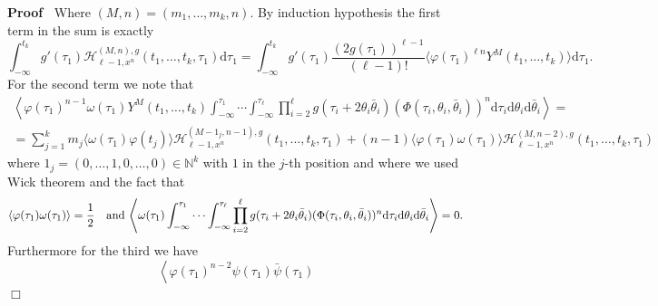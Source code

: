 \documentclass[a4paper,10pt]{article}
\newcommand{\mathd}{\mathrm{d}}
\newenvironment{proof}{\noindent\textbf{Proof\ }}{\hspace*{\fill}$\Box$\medskip}
\begin{document}
\begin{proof}
  Where $(M, n) = (m_1, \ldots, m_k, n)$. By induction hypothesis the first
  term in the sum is exactly
  \[ \int_{- \infty}^{t_k} g' (\tau_1) \mathcal{H}^{(M, n), g}_{\ell - 1, x^n}
     (t_1, \ldots, t_k, \tau_1) \mathd \tau_1 = \int_{- \infty}^{t_k} g'
     (\tau_1) \frac{(2 g (\tau_1))^{\ell - 1}}{(\ell - 1) !} \langle \varphi
     (\tau_1)^{\ell n} Y^M (t_1, \ldots, t_k) \rangle \mathd \tau_1 . \]
  For the second term we note that
  \begin{multline*} \left\langle \varphi (\tau_1)^{n - 1} \omega (\tau_1) Y^M (t_1, \ldots,
     t_k) \int_{- \infty}^{\tau_1} \cdots \int_{- \infty}^{\tau_{\ell}}
     \prod_{i = 2}^{\ell} g (\tau_i + 2 \theta_i \bar{\theta}_i) (\Phi
     (\tau_i, \theta_i, \bar{\theta}_i))^n \mathd \tau_i \mathd \theta_i
     \mathd \bar{\theta}_i \right\rangle = \\
   = \sum_{j = 1}^k m_j \langle \omega (\tau_1) \varphi (t_j) \rangle
     \mathcal{H}^{(M - 1_j, n - 1), g}_{\ell - 1, x^n} (t_1, \ldots, t_k,
     \tau_1) + (n - 1) \langle \varphi (\tau_1) \omega (\tau_1) \rangle
     \mathcal{H}^{(M, n - 2), g}_{\ell - 1, x^n} (t_1, \ldots, t_k, \tau_1) \end{multline*}
  where $1_j = (0, \ldots, 1, 0, \ldots, 0) \in \mathbb{N}^k$ with $1$ in the
  $j$-th position and where we used Wick theorem and the fact that
  \[ \text{$\langle \varphi (\tau_1) \omega (\tau_1) \rangle =
     \frac{1}{2}$\quad and $\left\langle \omega (\tau_1) \int_{-
     \infty}^{\tau_1} \cdots \int_{- \infty}^{\tau_{\ell}} \prod_{i =
     2}^{\ell} g (\tau_i + 2 \theta_i \bar{\theta}_i) (\Phi (\tau_i, \theta_i,
     \bar{\theta}_i))^n \mathd \tau_i \mathd \theta_i \mathd \bar{\theta}_i
     \right\rangle = 0$} . \]
  Furthermore for the third we have
  \[ \left\langle \varphi (\tau_1)^{n - 2} \psi (\tau_1) \bar{\psi} (\tau_1)
\]
\end{proof}
\end{document}
